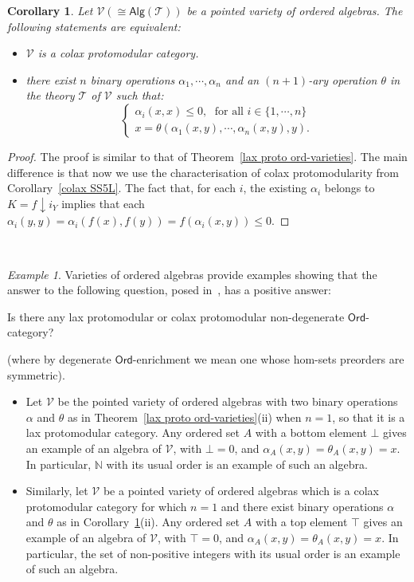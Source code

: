 \documentclass[11pt]{amsart}
\theoremstyle{plain}
\newtheorem{corollary}[subsection]{Corollary}
\theoremstyle{definition}
\theoremstyle{remark}
\newtheorem{example}[subsection]{Example}
\newcommand{\V}{\ensuremath{\mathcal{V}}}
\newcommand{\Ord}{\ensuremath{\mathsf{Ord}}}
\newcommand{\N}{\ensuremath{\mathbb{N}}}
\newcommand{\comma}[2]{ #1 \! \downarrow\! #2}
\newcommand{\T}{\ensuremath{\mathcal{T}}}
\newcommand{\Alg}[1]{\ensuremath{\mathsf{Alg}(#1)}}
\begin{document}
\begin{corollary}\label{colax proto ord-varieties} Let $\V(\cong \Alg{\T})$ be a pointed variety of ordered algebras. The following statements are equivalent:
\begin{itemize}
	\item[(i)] $\V$ is a colax protomodular category.
	\item[(ii)] there exist $n$ binary operations $\alpha_1,\cdots, \alpha_n$ and an $(n+1)$-ary operation $\theta$ in the theory $\T$ of $\V$ such that:
	\[
	\left\{\begin{array}{l}
		\alpha_i(x,x)\le 0, \;\mbox{ for all } i\in\{1, \cdots, n\} \\
		x=\theta(\alpha_1(x,y),\cdots, \alpha_n(x,y),y).
		\end{array}\right.
	\]
\end{itemize}
\end{corollary}
\begin{proof}
The proof is similar to that of Theorem~\ref{lax proto ord-varieties}. The main difference is that now we use the characterisation of colax protomodularity from Corollary~\ref{colax SS5L}. The fact that, for each $i$, the existing $\alpha_i$ belongs to $K=\comma{f}{i_Y}$ implies that each $\alpha_i(y,y)=\alpha_i(f(x),f(y))=f(\alpha_i(x,y))\le 0$.
\end{proof}\

\begin{example}\label{ex of (co)lax proto var}
Varieties of ordered algebras provide examples showing that the answer to the following question, posed in~\cite{CMR}, has a positive answer:
\begin{center} \textsf{Is there any lax protomodular or colax protomodular non-degenerate $\Ord$-category?} \end{center}
(where by degenerate $\Ord$-enrichment we mean one whose hom-sets preorders are symmetric).
\begin{itemize}
	\item[1.] Let $\V$ be the pointed variety of ordered algebras with two binary operations $\alpha$ and $\theta$ as in Theorem~\ref{lax proto ord-varieties}(ii) when $n=1$, so that it is a lax protomodular category.  Any ordered set $A$ with a bottom element $\bot$ gives an example of an algebra of $\V$, with $\bot=0$, and $\alpha_A(x,y)=\theta_A(x,y)=x$. In particular, $\N$ with its usual order is an example of such an algebra.
	\item[2.] Similarly, let $\V$ be a pointed variety of ordered algebras which is a colax protomodular category for which $n=1$ and there exist binary operations $\alpha$ and $\theta$ as in Corollary~\ref{colax proto ord-varieties}(ii). Any ordered set $A$ with a top element $\top$ gives an example of an algebra of $\V$, with $\top=0$, and $\alpha_A(x,y)=\theta_A(x,y)=x$. In particular, the set of non-positive integers with its usual order is an example of such an algebra.
\end{itemize}
\end{example}
\end{document}
